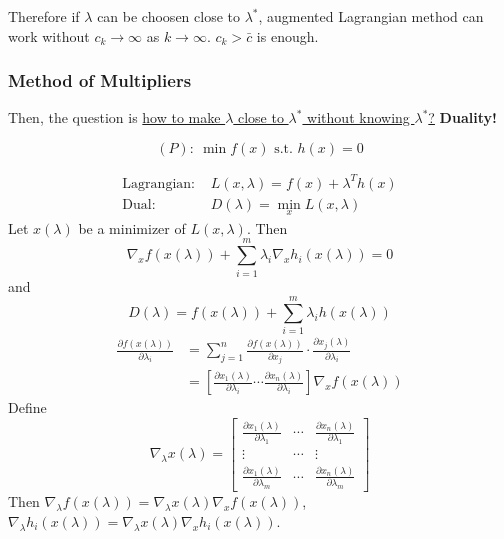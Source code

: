 \documentclass[11pt,a4paper]{article}
\begin{document}
Therefore if $\lambda$ can be choosen close to $\lambda^*$, augmented Lagrangian method can work without $c_k \rightarrow\infty$ as $k \rightarrow \infty$. $c_k>\bar{c}$ is enough.

\subsubsection{Method of Multipliers}
Then, the question is \underline{how to make $\lambda$ close to $\lambda^*$ without knowing $\lambda^*$?} \textbf{Duality!}

$$(P):\ \min f(x)\text{ s.t. }h(x)=0$$

\begin{equation}
    \begin{aligned}
        \text{Lagrangian: }& L(x,\lambda)=f(x)+\lambda^Th(x)\\
        \text{Dual: }& D(\lambda)=\min_x L(x,\lambda)
    \end{aligned}
    \nonumber
\end{equation}
Let $x(\lambda)$ be a minimizer of $L(x,\lambda)$. Then $$\nabla_x f(x(\lambda))+\sum_{i=1}^m\lambda_i \nabla_x h_i(x(\lambda))=0$$
and $$D(\lambda)=f(x(\lambda))+\sum_{i=1}^m\lambda_ih(x(\lambda))$$
\begin{equation}
    \begin{aligned}
        \frac{\partial f(x(\lambda))}{\partial \lambda_i}&=\sum_{j=1}^n \frac{\partial f(x(\lambda))}{\partial x_j}\cdot \frac{\partial x_j(\lambda)}{\partial \lambda_i}\\
        &=\left[\frac{\partial x_1(\lambda)}{\partial \lambda_i}\cdots \frac{\partial x_n(\lambda)}{\partial \lambda_i}\right] \nabla_x f(x(\lambda))
    \end{aligned}
    \nonumber
\end{equation}
Define $$\nabla_{\lambda}x(\lambda)=\begin{bmatrix}
    \frac{\partial x_1(\lambda)}{\partial \lambda_1}&\cdots &\frac{\partial x_n(\lambda)}{\partial \lambda_1}\\
    \vdots &\cdots &\vdots\\
    \frac{\partial x_1(\lambda)}{\partial \lambda_m}&\cdots &\frac{\partial x_n(\lambda)}{\partial \lambda_m}
\end{bmatrix}$$
Then $\nabla_{\lambda} f(x(\lambda))=\nabla_\lambda x(\lambda) \nabla_x f(x(\lambda))$, $\nabla_{\lambda} h_i(x(\lambda))=\nabla_{\lambda}x(\lambda)\nabla_xh_i(x(\lambda))$.
\end{document}
